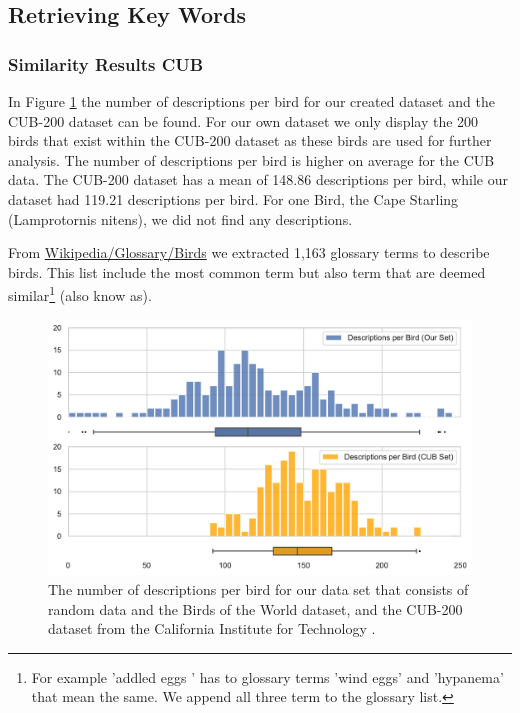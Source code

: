 \documentclass[a4paper, 12pt, oneside]{book} %
\begin{document}
\subsection{Retrieving Key Words}
\subsubsection{Similarity Results CUB}
In Figure \ref{fig:CUB_distribution} the number of descriptions per bird for our created dataset and the CUB-200 dataset can be found.
For our own dataset we only display the 200 birds that exist within the CUB-200 dataset as these birds are used for further analysis.
The number of descriptions per bird is higher on average for the CUB data.
The CUB-200 dataset has a mean of 148.86 descriptions per bird, while our dataset had 119.21 descriptions per bird.
For one Bird, the Cape Starling (Lamprotornis nitens), we did not find any descriptions.

From \href{https://en.wikipedia.org/wiki/Glossary_of_bird_terms}{Wikipedia/Glossary/Birds} we extracted 1,163 glossary terms to describe birds.
This list include the most common term but also term that are deemed similar\footnote{For example 'addled eggs ' has to glossary terms 'wind eggs' and 'hypanema' that mean the same. We append all three term to the glossary list.} (also know as).

\begin{figure}[h!]
 \centering
 \includegraphics[width=\textwidth]{figures/CUB_distribution.pdf}
 \caption[Bird description distribution]{The number of descriptions per bird for our data set that consists of random data and the Birds of the World dataset, and the CUB-200 dataset from the California Institute for Technology \autocite{welinder_caltech-ucsd_2010}. }
 \label{fig:CUB_distribution}
\end{figure}
\end{document}
